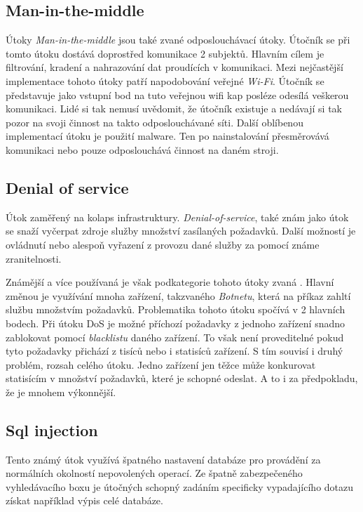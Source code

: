 
\subsection{Man-in-the-middle}
Útoky \textit{Man-in-the-middle} jsou také zvané odposlouchávací útoky.
Útočník se při tomto útoku dostává doprostřed komunikace 2 subjektů.
Hlavním cílem je filtrování, kradení a nahrazování dat proudících v komunikaci.
Mezi nejčastější implementace tohoto útoky patří napodobování veřejné \textit{Wi-Fi}.
Útočník se představuje jako vstupní bod na tuto veřejnou wifi kap posléze odesílá veškerou komunikaci.
Lidé si tak nemusí uvědomit, že útočník existuje a nedávají si tak pozor na svoji činnost na takto odposlouchávané síti.
Další oblíbenou implementací útoku je použití malware.
Ten po nainstalování přesměrovává komunikaci nebo pouze odposlouchává činnost na daném stroji.\cite{cisco_most_common_attack}

\subsection{Denial of service}
Útok zaměřený na kolaps infrastruktury.
\textit{Denial-of-service}, také znám jako  útok se snaží vyčerpat zdroje služby množství zasílaných požadavků.
Další možností je ovládnutí nebo alespoň vyřazení z provozu dané služby za pomocí známe zranitelnosti.\cite{cisco_most_common_attack}


Známější a více používaná je však podkategorie tohoto útoky zvaná .
Hlavní změnou je využívání mnoha zařízení, takzvaného \textit{Botnetu}, která na příkaz zahltí službu množstvím požadavků.
Problematika tohoto útoku spočívá v 2 hlavních bodech.
Při útoku \ac{DoS} je možné příchozí požadavky z jednoho zařízení snadno zablokovat pomocí \textit{blacklistu} daného zařízení.
To však není proveditelné pokud tyto požadavky přichází z tisíců nebo i statisíců zařízení.
S tím souvisí i druhý problém, rozsah celého útoku.
Jedno zařízení jen těžce může konkurovat statisícím v množství požadavků, které je schopné odeslat.
A to i za předpokladu, že je mnohem výkonnější.

\subsection{Sql injection}
Tento známý útok využívá špatného nastavení databáze pro provádění za normálních okolností nepovolených operací.
Ze špatně zabezpečeného vyhledávacího boxu je útočných schopný zadáním specificky vypadajícího dotazu získat například výpis celé databáze.

